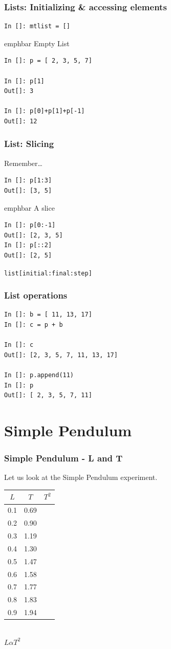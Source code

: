 \documentclass[14pt,compress]{beamer}
\newcommand{\emphbar}[1]
{\begin{beamercolorbox}[rounded=true]{emphbar} 
      {#1}
 \end{beamercolorbox}
}
\newcounter{time}
\newcommand{\inctime}[1]{\addtocounter{time}{#1}{\tiny \thetime\ m}}
\newcommand{\typ}[1]{\lstinline{#1}}
\newcommand{\kwrd}[1]{ \texttt{\textbf{\color{blue}{#1}}}  }
\begin{document}
\begin{frame}[fragile]
\frametitle{Lists: Initializing \& accessing elements}
\begin{lstlisting}
In []: mtlist = [] 
\end{lstlisting}
\emphbar{Empty List}
\begin{lstlisting}
In []: p = [ 2, 3, 5, 7] 

In []: p[1]
Out[]: 3

In []: p[0]+p[1]+p[-1]
Out[]: 12
\end{lstlisting}
\end{frame}

\begin{frame}[fragile]
  \frametitle{List: Slicing}
  \begin{block}{Remember\ldots}
	\kwrd{In []: p = [ 2, 3, 5, 7]}
  \end{block}
\begin{lstlisting}
In []: p[1:3]
Out[]: [3, 5]
\end{lstlisting}
\emphbar{A slice}
\begin{lstlisting}
In []: p[0:-1]
Out[]: [2, 3, 5]
In []: p[::2]
Out[]: [2, 5]
\end{lstlisting}
\alert{\typ{list[initial:final:step]}}
\end{frame}

\begin{frame}[fragile]
\frametitle{List operations}
\begin{lstlisting}
In []: b = [ 11, 13, 17]
In []: c = p + b

In []: c
Out[]: [2, 3, 5, 7, 11, 13, 17]

In []: p.append(11)
In []: p
Out[]: [ 2, 3, 5, 7, 11]
\end{lstlisting}
\end{frame}

\section{Simple Pendulum}
\begin{frame}[fragile]
\frametitle{Simple Pendulum - L and T}
Let us look at the Simple Pendulum experiment.
\begin{center}
\begin{small}
\begin{tabular}{| c | c | c |}
\hline
$L$ & $T$ & $T^2$ \\ \hline
0.1 & 0.69 & \\ \hline
0.2 & 0.90 & \\ \hline
0.3 & 1.19 & \\ \hline
0.4 & 1.30 & \\ \hline
0.5 & 1.47 & \\ \hline
0.6 & 1.58 & \\ \hline
0.7 & 1.77 & \\ \hline
0.8 & 1.83 & \\ \hline
0.9 & 1.94 & \\ \hline
\end{tabular}
\end{small}\\
\alert{$L \alpha T^2$}
\end{center}
\end{frame}
\end{document}
